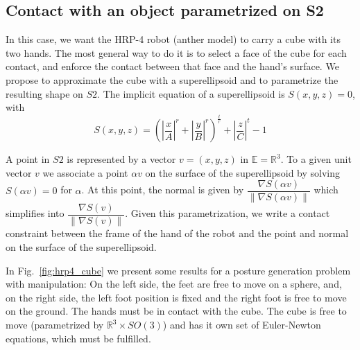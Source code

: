 \subsection{Contact with an object parametrized on S2}

In this case, we want the HRP-4 robot (anther model) to carry a cube with its two hands.
The most general way to do it is to select a face of the cube for each contact, and enforce the contact between that face and the hand's surface.
We propose to approximate the cube with a superellipsoid and to parametrize the resulting shape on $S2$.
The implicit equation of a superellipsoid is $S(x,y,z) = 0$, with
\begin{equation}
  S(x,y,z) = {\left( \left|\frac{x}{A}\right|^r + \left|\frac{y}{B}\right|^r\right)}^\frac{t}{r} + \left|\frac{z}{C}\right|^t - 1
  \label{eq:super_ellipsoid}
\end{equation}

A point in $S2$ is represented by a vector $v=(x,y,z)$ in $\mathbb{E} = \mathbb{R}^3$.
To a given unit vector $v$ we associate a point $\alpha v$ on the surface of the superellipsoid by solving $S(\alpha v) = 0$ for $\alpha$.
At this point, the normal is given by $\dfrac{\nabla S(\alpha v)}{\left\|\nabla S(\alpha v)\right\|}$ which simplifies into $\dfrac{\nabla S(v)}{\left\|\nabla S(v)\right\|}$.
Given this parametrization, we write a contact constraint between the frame of the hand of the robot and the point and normal on the surface of the superellipsoid.

In Fig.~\ref{fig:hrp4_cube} we present some results for a posture generation problem with manipulation: On the left side, the feet are free to move on a sphere, and, on the right side, the left foot position is fixed and the right foot is free to move on the ground.
The hands must be in contact with the cube.
The cube is free to move (parametrized by $\mathbb{R}^3 \times SO(3)$) and has it own set of Euler-Newton equations, which must be fulfilled.


